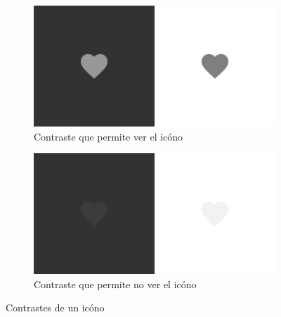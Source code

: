 \vspace{1cm}
\begin{figure}[hbt]
	\centering
	\begin{subfigure}[b]{0.4\linewidth}
		\centering
        \includegraphics[width=1\linewidth]{figs/Desarrollo/Accesibilidad/corazonesbien}
        \caption[Contraste que permite ver el icóno]{Contraste que permite ver el icóno}
	\end{subfigure} 
	\begin{subfigure}[b]{0.4\linewidth}
		\centering
        \includegraphics[width=1\linewidth]{figs/Desarrollo/Accesibilidad/corazonesmal}
        \caption[Contraste que no permite ver el icóno]{Contraste que permite no ver el icóno}
	\end{subfigure} 
	\caption[Contrastes de un icóno]{Contrastes de un icóno}
	\label{fig:corazones}
\end{figure}

\vspace{1cm}

